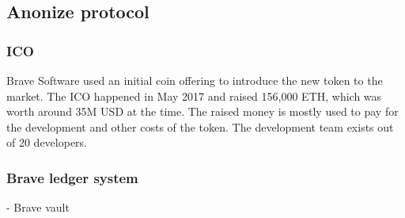\subsection{Anonize protocol}


\subsubsection{ICO}
Brave Software used an initial coin offering to introduce the new token to the market. The ICO happened in May 2017 and raised 156,000 ETH, which was worth around 35M USD at the time. The raised money is mostly used to pay for the development and other costs of the token. The development team exists out of 20 developers.

\subsubsection{Brave ledger system}

- Brave vault

\subsection{}




